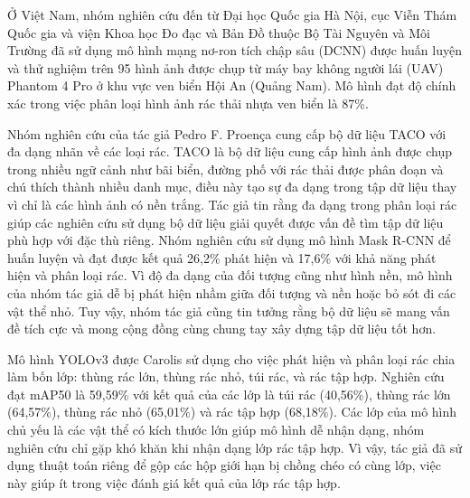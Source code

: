\documentclass[../the.tex]{subfiles}
\begin{document}
\bigskip

{\fontsize{13}{12} \selectfont

	Ở Việt Nam, nhóm nghiên cứu đến từ Đại học Quốc gia Hà Nội, cục Viễn
	Thám Quốc gia và viện Khoa học Đo đạc và Bản Đồ thuộc Bộ Tài Nguyên và
	Môi Trường \cite{nhung2021nghien} đã sử dụng mô hình mạng nơ-ron tích chập sâu (DCNN) được
	huấn luyện và thử nghiệm trên 95 hình ảnh được chụp từ máy bay không người
	lái (UAV) Phantom 4 Pro ở khu vực ven biển Hội An (Quảng Nam). Mô hình
	đạt độ chính xác trong việc phân loại hình ảnh rác thải nhựa ven biển là 87\%.

}

\bigskip

{\fontsize{13}{12} \selectfont

	Nhóm nghiên cứu của tác giả Pedro F. Proença \cite{proença2020taco} cung cấp bộ dữ liệu TACO với đa dạng nhãn về các loại rác.
	TACO là bộ dữ liệu cung cấp hình ảnh được chụp trong nhiều ngữ cảnh như bãi biển, đường phố với rác thải được phân đoạn và
	chú thích thành nhiều danh mục, điều này tạo sự đa dạng trong tập dữ liệu thay vì chỉ là các hình ảnh có nền trắng.
	Tác giả tin rằng đa dạng trong phân loại rác giúp các nghiên cứu sử dụng bộ dữ liệu giải quyết được vấn đề tìm tập dữ liệu phù hợp với đặc thù riêng.
	Nhóm nghiên cứu sử dụng mô hình Mask R-CNN để huấn luyện và đạt được kết quả 26,2\% phát hiện và 17,6\% với khả năng phát hiện và phân loại rác.
	Vì độ đa dạng của đối tượng cũng như hình nền, mô hình của nhóm tác giả dễ bị phát hiện nhầm giữa đối tượng và nền hoặc bỏ sót đi các vật thể nhỏ.
	Tuy vậy, nhóm tác giả cũng tin tưởng rằng bộ dữ liệu sẽ mang vấn đề tích cực và mong cộng đồng cùng chung tay xây dựng tập dữ liệu tốt hơn.

}

\bigskip

{\fontsize{13}{12} \selectfont

	Mô hình YOLOv3 \cite{redmon2018yolov3} được Carolis \etal \cite{9122693} sử dụng cho việc phát hiện và phân loại rác chia làm bốn lớp: thùng rác lớn, thùng rác nhỏ, túi rác, và rác tập hợp.
	Nghiên cứu đạt mAP50 là 59,59\% với kết quả của các lớp là túi rác (40,56\%), thùng rác lớn (64,57\%), thùng rác nhỏ (65,01\%) và rác tập hợp (68,18\%).
	Các lớp của mô hình chủ yếu là các vật thể có kích thước lớn giúp mô hình dễ nhận dạng, nhóm nghiên cứu chỉ gặp khó khăn khi nhận dạng lớp rác tập hợp.
	Vì vậy, tác giả đã sử dụng thuật toán riêng để gộp các hộp giới hạn bị chồng chéo có cùng lớp, việc này giúp ít trong việc đánh giá kết quả của lớp rác tập hợp.

}
\end{document}

